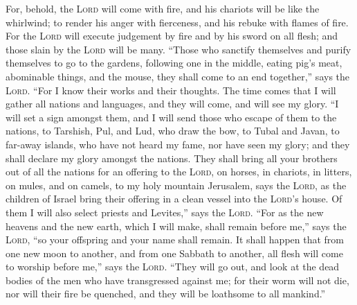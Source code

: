  For, behold, the \textsc{Lord} will come with fire, and
his chariots will be like the whirlwind; to render his anger with
fierceness, and his rebuke with flames of fire.  For the
\textsc{Lord} will execute judgement by fire and by his sword on all
flesh; and those slain by the \textsc{Lord} will be many.
 ``Those who sanctify themselves and purify themselves to
go to the gardens, following one in the middle, eating pig's meat,
abominable things, and the mouse, they shall come to an end together,''
says the \textsc{Lord}.  ``For I know their works and
their thoughts. The time comes that I will gather all nations and
languages, and they will come, and will see my glory. 
``I will set a sign amongst them, and I will send those who escape of
them to the nations, to Tarshish, Pul, and Lud, who draw the bow, to
Tubal and Javan, to far-away islands, who have not heard my fame, nor
have seen my glory; and they shall declare my glory amongst the nations.
 They shall bring all your brothers out of all the
nations for an offering to the \textsc{Lord}, on horses, in chariots, in
litters, on mules, and on camels, to my holy mountain Jerusalem, says
the \textsc{Lord}, as the children of Israel bring their offering in a
clean vessel into the \textsc{Lord}'s house.  Of them I
will also select priests and Levites,'' says the \textsc{Lord}.
 ``For as the new heavens and the new earth, which I will
make, shall remain before me,'' says the \textsc{Lord}, ``so your
offspring and your name shall remain.  It shall happen
that from one new moon to another, and from one Sabbath to another, all
flesh will come to worship before me,'' says the \textsc{Lord}.
 ``They will go out, and look at the dead bodies of the
men who have transgressed against me; for their worm will not die, nor
will their fire be quenched, and they will be loathsome to all
mankind.''
